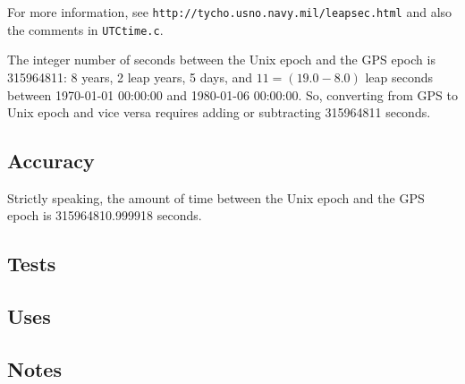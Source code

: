 For more information, see \texttt{http://tycho.usno.navy.mil/leapsec.html}
and also the comments in \texttt{UTCtime.c}.

The integer number of seconds between the Unix epoch and the GPS epoch is
315964811: 8 years, 2 leap years, 5 days, and $11 = (19.0 - 8.0)$ leap
seconds between 1970-01-01 00:00:00 and 1980-01-06 00:00:00.  So,
converting from GPS to Unix epoch and vice versa requires adding or
subtracting 315964811 seconds.

\subsection{Accuracy}

Strictly speaking, the amount of time between the Unix epoch and the GPS
epoch is 315964810.999918 seconds.

\subsection{Tests}
\label{sec:utogpsc:tests}

\subsection{Uses}
\label{sec:utogpsc:uses}


\subsection{Notes}
\label{sec:utogpsc:notes}


